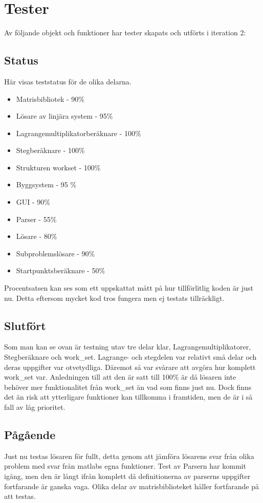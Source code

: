 \newpage
\section{Tester}
Av följande objekt och funktioner har tester skapats och utförts i iteration 2:

\subsection{Status}
Här visas teststatus för de olika delarna.
\begin{itemize}
\item{Matrisbibliotek - 90\%}
\item{Lösare av linjära system - 95\%}
\item{Lagrangemultiplikatorberäknare - 100\%}
\item{Stegberäknare - 100\%}
\item{Strukturen work\underline{\space}set - 100\%}
\item{Byggsystem - 95 \%}
\item{GUI - 90\%}
\item{Parser - 55\%}
\item{Lösare - 80\%}
\item{Subproblemslösare - 90\%}
\item{Startpunktsberäknare - 50\%}
\end{itemize}
\raggedright Procentsatsen kan ses som ett uppskattat mått på hur tillförlitlig koden är just nu. Detta eftersom mycket kod tros fungera men ej testats tillräckligt. 

\newpage
\subsection{Slutfört}
Som man kan se ovan är testning utav tre delar klar, Lagrangemultiplikatorer, Stegberäknare och work\_set. Lagrange- och stegdelen var relativt små delar och deras uppgifter var otvetydliga. Däremot så var svårare att avgöra hur komplett work\_set var. Anledningen till att den är satt till 100\% är då lösaren inte behöver mer funktionalitet från work\_set än vad som finns just nu. Dock finns det än risk att ytterligare funktioner kan tillkomma i framtiden, men de är i så fall av låg prioritet. 

\subsection{Pågående}
Just nu testas lösaren för fullt, detta genom att jämföra lösarens svar från olika problem med svar från matlabs egna funktioner. \newline
Test av Parsern har kommit igång, men den är långt ifrån komplett då definitionerna av parserns uppgifter fortfarande är ganska vaga. \newline 
Olika delar av matrisbiblioteket håller fortfarande på att testas. 

